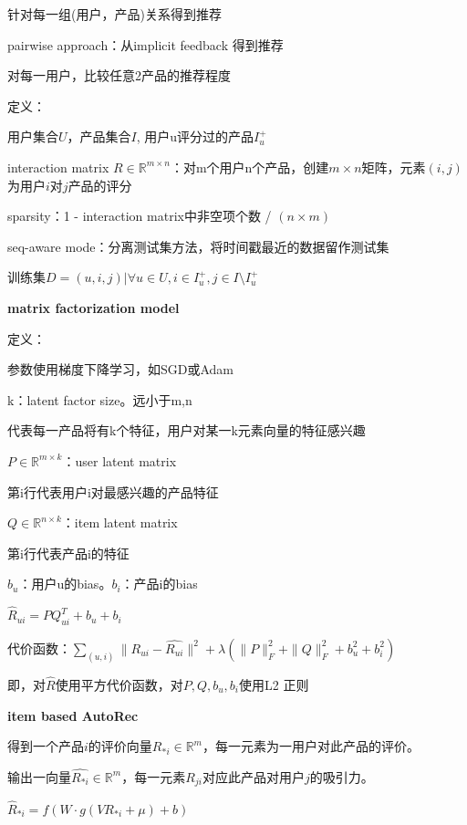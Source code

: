 \documentclass[UTF8]{ctexart}
\begin{document}
  \quad \quad 针对每一组(用户，产品)关系得到推荐

  \quad pairwise approach：从implicit feedback 得到推荐

  \quad \quad 对每一用户，比较任意2产品的推荐程度

  定义：

  \quad 用户集合$U$，产品集合$I$, 用户u评分过的产品$I_u^+$

  \quad interaction matrix $R \in \mathbb{R}^{m \times n}$：对m个用户n个产品，创建$m \times n$矩阵，元素$(i, j)$为用户$i$对$j$产品的评分

  \quad sparsity：1 - interaction matrix中非空项个数 / $(n \times m)$

  \quad seq-aware mode：分离测试集方法，将时间戳最近的数据留作测试集

  \quad 训练集$D = {(u, i, j) | \forall u \in U, i \in I_u^+, j \in I \setminus I_u^+}$


  \textbf{matrix factorization model}

  \quad 定义：

  \quad \quad 参数使用梯度下降学习，如SGD或Adam

  \quad \quad k：latent factor size。远小于m,n

  \quad \quad \quad 代表每一产品将有k个特征，用户对某一k元素向量的特征感兴趣

  \quad \quad $P \in \mathbb{R}^{m \times k}$：user latent matrix

  \quad \quad \quad 第i行代表用户i对最感兴趣的产品特征

  \quad \quad $Q \in \mathbb{R}^{n \times k}$：item latent matrix

  \quad \quad \quad 第i行代表产品i的特征

  \quad \quad $b_u$：用户u的bias。$b_i$：产品i的bias

  \quad \quad $\hat{R}_{ui} = PQ^T_{ui} + b_u + b_i$

  \quad 代价函数：$\sum_{(u, i)} \|R_{ui} - \hat{R_{ui}}\|^2 + \lambda(\|P\|_F^2 + \|Q\|_F^2 + b_u^2 + b_i^2)$

  \quad \quad 即，对$\hat{R}$使用平方代价函数，对$P, Q, b_u, b_i$使用L2 正则 

  \textbf{item based AutoRec}

  \quad 得到一个产品$i$的评价向量$R_{*i} \in \mathbb{R}^m$，每一元素为一用户对此产品的评价。
  
  \quad 输出一向量$\hat{R_{*i}} \in \mathbb{R}^m$，每一元素$R_{ji}$对应此产品对用户$j$的吸引力。

  \quad $\hat{R}_{*i} = f(W \cdot g(VR_{*i} + \mu) + b)$
\end{document}

